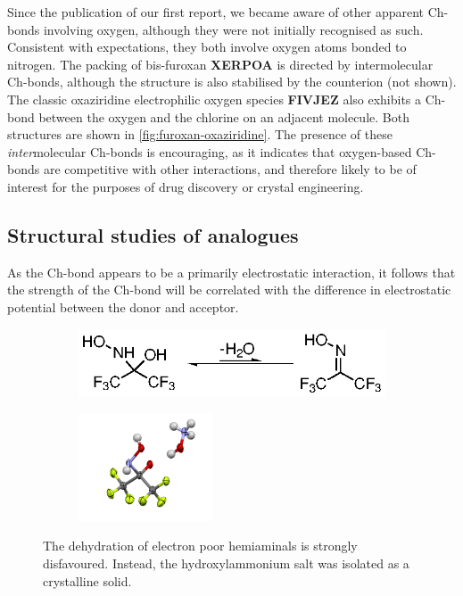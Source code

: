 \begin{refsection}
Since the publication of our first report, we became aware of other apparent Ch-bonds involving oxygen, although they were not initially recognised as such.
Consistent with expectations, they both involve oxygen atoms bonded to nitrogen.
The packing of bis-furoxan \textbf{XERPOA} is directed by intermolecular  Ch-bonds, although the structure is also stabilised by the  counterion (not shown).\autocite{Gilardi2005}
The classic oxaziridine electrophilic oxygen species \textbf{FIVJEZ} also exhibits a Ch-bond between the oxygen and the chlorine on an adjacent molecule.\autocite{Malpezzi1987}
Both structures are shown in \cref{fig:furoxan-oxaziridine}.
The presence of these \emph{inter}molecular Ch-bonds is encouraging, as it indicates that oxygen-based Ch-bonds are competitive with other interactions, and therefore likely to be of interest for the purposes of drug discovery or crystal engineering.\autocite{Taylor2020}

\subsection{Structural studies of analogues}
As the Ch-bond appears to be a primarily electrostatic interaction, it follows that the strength of the Ch-bond will be correlated with the difference in electrostatic potential between the donor and acceptor.

\begin{figure}
    \centering
    \begin{subfigure}{0.45\linewidth}
        \includegraphics[scale=0.74,trim=0 -1cm 0 -1cm]{Figures/hexafluoroacetone.eps}
    \end{subfigure}
    \begin{subfigure}{0.45\linewidth}
        \includegraphics[width=4cm]{Figures/hexafluoroacetone_oxime.pdf}
    \end{subfigure}
    \caption[Dehydration of electron poor hemiaminals.]{The dehydration of electron poor hemiaminals is strongly disfavoured. Instead, the hydroxylammonium salt was isolated as a crystalline solid.}\label{sch:hexafluoroacetone}
\end{figure}


\end{refsection}

